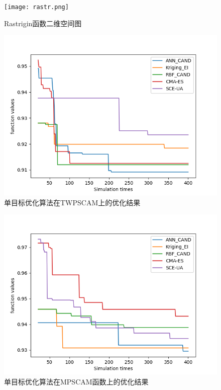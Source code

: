 \begin{figure}[H] %
  \centering
  \texttt{[image: rastr.png]}
  \caption{Rastrigin函数二维空间图}
  \label{fig:xfig1}
\end{figure}

\begin{figure}[H] %
  \centering
  \includegraphics[scale=0.6]{figures/all_scam_new.png}
  \caption{单目标优化算法在TWPSCAM上的优化结果}
  \label{fig:xfig1}
\end{figure} 

\begin{figure}[H] %
  \centering
  \includegraphics[scale=0.6]{figures/all_scam_ARW.png}
  \caption{单目标优化算法在MPSCAM函数上的优化结果}
  \label{fig:xfig1}
\end{figure}

